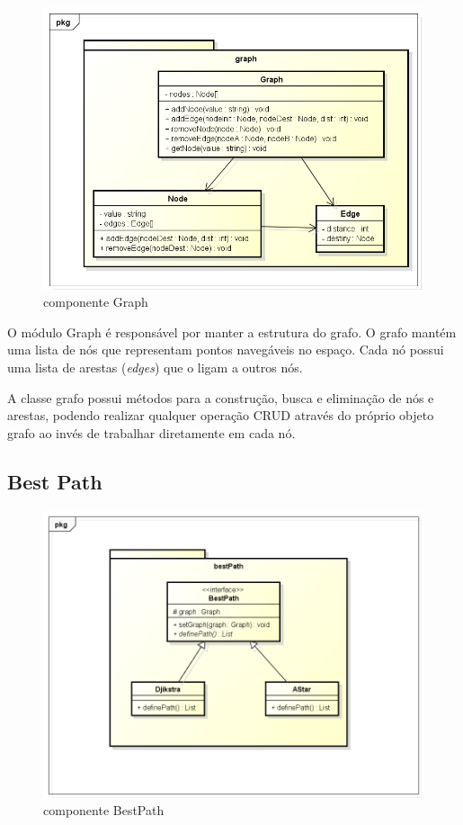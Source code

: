 \begin{figure}[h]
	\centering
	\label{fig26}
		\includegraphics[keepaspectratio=true,scale=0.5]{figuras/pkggraph.png}
	\caption{componente Graph}
\end{figure}

O módulo Graph é responsável por manter a estrutura do grafo. O grafo mantém uma lista de nós que representam pontos navegáveis no espaço. Cada nó possui uma lista de arestas (\textit{edges}) que o ligam a outros nós.

A classe grafo possui métodos para a construção, busca e eliminação de nós e arestas, podendo realizar qualquer operação CRUD através do próprio objeto grafo ao invés de trabalhar diretamente em cada nó.

\subsection{Best Path}

\begin{figure}[h]
	\centering
	\label{fig27}
		\includegraphics[keepaspectratio=true,scale=0.5]{figuras/pkgbestPath.png}
	\caption{componente BestPath}
\end{figure}


